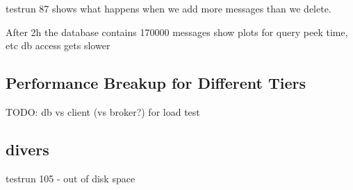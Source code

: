 \documentclass[milestone1.tex]{subfiles}
\begin{document}
testrun 87 shows what happens when we add more messages than we delete. 

After 2h the database contains 170000 messages
show plots for query peek time, etc
db access gets slower


\subsection{Performance Breakup for Different Tiers}

TODO: db vs client (vs broker?) for load test


\subsection{divers}

testrun 105 - out of disk space
\end{document}
